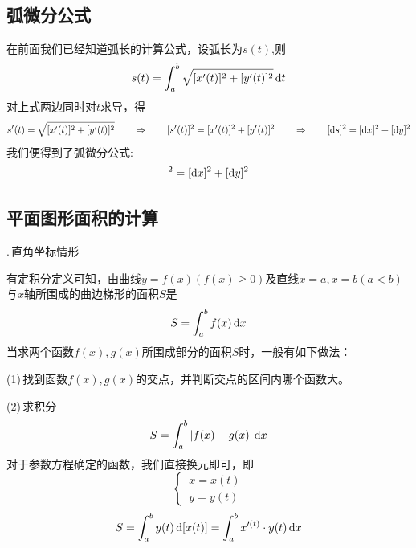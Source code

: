 \subsection{弧微分公式}
在前面我们已经知道弧长的计算公式，设弧长为$s(t)$,则
\begin{equation}
	s(t)=\int_{a}^{b}\sqrt{[x'(t)]^2+[y'(t)]^2}\,{\rm{d}} t
\end{equation}
对上式两边同时对$t$求导，得
\begin{equation}
	s'(t)=\sqrt{[x'(t)]^2+[y'(t)]^2}\hspace*{2em} \Rightarrow \hspace{2em} [s'(t)]^2=[x'(t)]^2+[y'(t)]^2 \hspace*{2em} \Rightarrow  \hspace*{2em} [{\rm{d}} s]^2=[{\rm{d}} x]^2+[{\rm{d}} y]^2
\end{equation}
我们便得到了弧微分公式:
\begin{equation}
	[\d s]^2=[\d x]^2+[\d y]^2
\end{equation}
\subsection{平面图形面积的计算}
.$\,$直角坐标情形
\par 有定积分定义可知，由曲线$y=f(x)(f(x)\geq 0)$及直线$x=a,x=b(a<b)$与$x$轴所围成的曲边梯形的面积$S$是
\begin{equation}
	S=\int_{a}^{b}f(x)\,{\rm{d}} x
\end{equation}
当求两个函数$f(x),g(x)$所围成部分的面积$S$时，一般有如下做法：

(1)$\,$找到函数$f(x),g(x)$的交点，并判断交点的区间内哪个函数大。

(2)$\,$求积分
\begin{equation}
	S=\int_{a}^{b}|f(x)-g(x)|\,{\rm{d}} x
\end{equation}
对于参数方程确定的函数，我们直接换元即可，即
\begin{equation}
	\nonumber
	\begin{cases}
		\, x=x(t)\\
		\, y=y(t)
	\end{cases}
\end{equation}
\begin{equation}
	S=\int_{a}^{b}y(t)\,{\rm{d}} [x(t)]=\int_{a}^{b}x'^{(t)}\cdot y(t)\,{\rm{d}} x
\end{equation}

